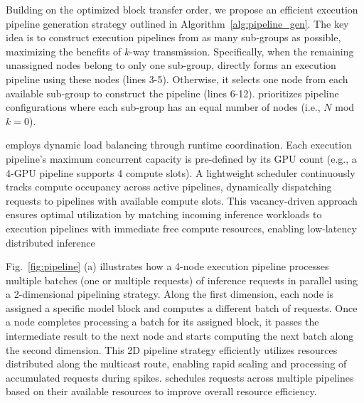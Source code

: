 Building on the optimized block transfer order, we propose an efficient execution pipeline generation strategy outlined in Algorithm~\ref{alg:pipeline_gen}. 
The key idea is to construct execution pipelines from as many sub-groups as possible, maximizing the benefits of $k$-way transmission. 
Specifically, when the remaining unassigned nodes belong to only one sub-group, \AlgoName directly forms an execution pipeline using these nodes (lines 3-5). Otherwise, it selects one node from each available sub-group to construct the pipeline (lines 6-12). 
\SysName prioritizes pipeline configurations where each sub-group has an equal number of nodes (i.e., $N$ mod $k = 0$). 


\SysName employs dynamic load balancing through runtime coordination. Each execution pipeline's maximum concurrent capacity is pre-defined by its GPU count (e.g., a 4-GPU pipeline supports 4 compute slots). A lightweight scheduler continuously tracks compute occupancy across active pipelines, dynamically dispatching requests to pipelines with available compute slots. This vacancy-driven approach ensures optimal utilization by matching incoming inference workloads to execution pipelines with immediate free compute resources, enabling low-latency distributed inference

\fi

Fig.~\ref{fig:pipeline} (a) illustrates how a 4-node execution pipeline processes multiple batches (one or multiple requests) of inference requests in parallel using a 2-dimensional pipelining strategy. Along the first dimension, each node is assigned a specific model block and computes a different batch of requests. Once a node completes processing a batch for its assigned block, it passes the intermediate result to the next node and starts computing the next batch along the second dimension. 
This 2D pipeline strategy efficiently utilizes resources distributed along the multicast route, enabling rapid scaling and processing of accumulated requests during spikes. 
\SysName schedules requests across multiple pipelines based on their available resources to improve overall resource efficiency.


